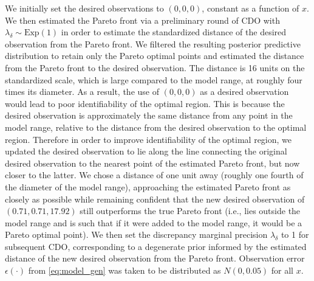 \documentclass[12pt]{article}
\begin{document}
We initially set the desired observations to $(0,0,0)$, constant as a function of $x$. 
%
We then estimated the Pareto front via a preliminary round of CDO with $\lambda_\delta\sim \mathrm{Exp}(1)$ in order to estimate the standardized distance of the desired observation from the Pareto front.
%
We filtered the resulting posterior predictive distribution to retain only the Pareto optimal points and estimated the distance from the Pareto front to the desired observation.
%
The distance is 16 units on the standardized scale, which is large compared to the model range, at roughly four times its diameter.
%
As a result, the use of $(0,0,0)$ as a desired observation would lead to poor identifiability of the optimal region. 
%
This is because the desired observation is approximately the same distance from any point in the model range, relative to the distance from the desired observation to the optimal region.
%
%
Therefore in order to improve identifiability of the optimal region, we updated the desired observation to lie along the line connecting the original desired observation to the nearest point of the estimated Pareto front, but now closer to the latter.
%
We chose a distance of one unit away (roughly one fourth of the diameter of the model range), approaching the estimated Pareto front as closely as possible while remaining confident that the new desired observation of $(0.71, 0.71, 17.92)$ still outperforms the true Pareto front (i.e., lies outside the model range and is such that if it were added to the model range, it would be a Pareto optimal point).
%
We then set the discrepancy marginal precision $\lambda_\delta$ to 1 for subsequent CDO, corresponding to a degenerate prior informed by the estimated distance of the new desired observation from the Pareto front.
%
Observation error $\epsilon(\cdot)$ from \eqref{eq:model_gen} was taken to be distributed as $N(0,0.05)$ for all $x$.
\end{document}
